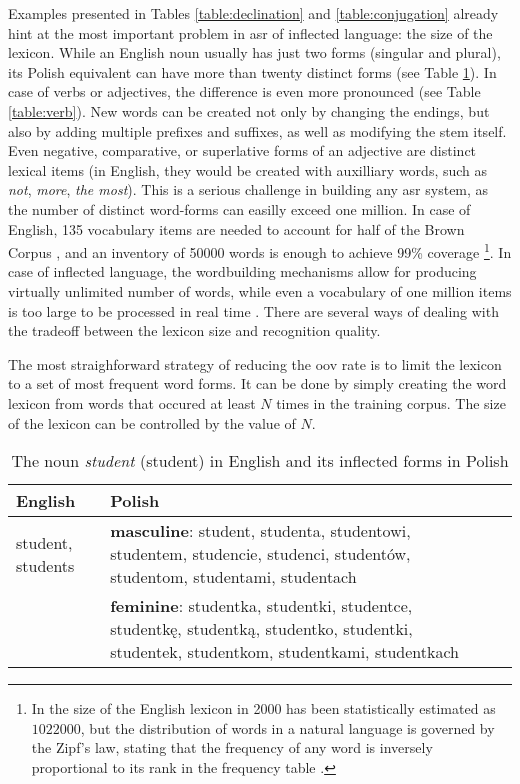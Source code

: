 Examples presented in Tables \ref{table:declination} and \ref{table:conjugation} already hint at the most important problem in \gls{asr} of inflected language: the size of the lexicon. While an English noun usually has just two forms (singular and plural), its Polish equivalent can have more than twenty distinct forms (see Table \ref{table:noun}). In case of verbs or adjectives, the difference is even more pronounced (see Table \ref{table:verb}). New words can be created not only by changing the endings, but also by adding multiple prefixes and suffixes, as well as modifying the stem itself. Even negative, comparative, or superlative forms of an adjective are distinct lexical items (in English, they would be created with auxilliary words, such as \textit{not}, \textit{more}, \textit{the most}). This is a serious challenge in building any \gls{asr} system, as the number of distinct word-forms can easilly exceed one million. In case of English, 135 vocabulary items are needed to account for half of the Brown Corpus \cite{fagan2011introduction}, and an inventory of 50000 words is enough to achieve 99\% coverage \footnote{In \cite{michel2011quantitative} the size of the English lexicon in 2000 has been statistically estimated as $1022000$, but the distribution of words in a natural language is governed by the Zipf's law, stating that the frequency of any word is inversely proportional to its rank in the frequency table \cite{li1992random}.}. In case of inflected language, the wordbuilding mechanisms allow for producing virtually unlimited number of words, while even a vocabulary of one million items is too large to be processed in real time \cite{nouza2010challenges}. There are several ways of dealing with the tradeoff between the lexicon size and recognition quality.

The most straighforward strategy of reducing the \gls{oov} rate is to limit the lexicon to a set of most frequent word forms. It can be done by simply creating the word lexicon from words that occured at least $N$ times in the training corpus. The size of the lexicon can be controlled by the value of $N$.
\begin{table}[!ht]
  \caption{The noun \textit{student} (student) in English and its inflected forms in Polish}
    \label{table:noun}
    \centering
    \begin{tabularx}{.8\linewidth}{@{}p{}Xp{}X@{}}
      English & Polish\\
      \hline
      \raggedright student, students & \textbf{masculine}: student, studenta, studentowi, studentem, studencie, studenci, studentów, studentom, studentami, studentach\\
                        & \textbf{feminine}: studentka, studentki, studentce, studentkę, studentką, studentko, studentki, studentek, studentkom, studentkami, studentkach\\
    \end{tabularx}
\end{table}

